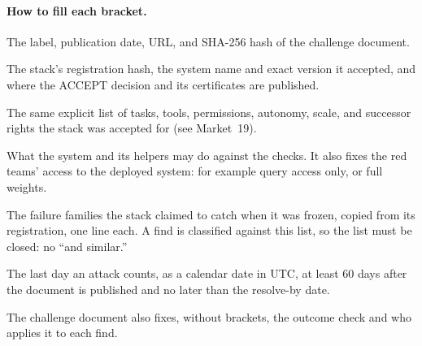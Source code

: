 \begin{predictionbackground}
\paragraph{How to fill each bracket.}
\begin{description}[style=nextline,leftmargin=1.6em]
\item[{\texttt{[protocol version]}}]
The label, publication date, URL, and SHA-256 hash of the challenge document.
\item[{\texttt{[stack, system, and version]}}]
The stack's registration hash, the system name and exact version it accepted, and where the ACCEPT decision and its certificates are published.
\item[{\texttt{[deployment class]}}]
The same explicit list of tasks, tools, permissions, autonomy, scale, and successor rights the stack was accepted for (see Market~19).
\item[{\texttt{[threat model]}}]
What the system and its helpers may do against the checks.
It also fixes the red teams' access to the deployed system: for example query access only, or full weights.
\item[{\texttt{[listed families]}}]
The failure families the stack claimed to catch when it was frozen, copied from its registration, one line each.
A find is classified against this list, so the list must be closed: no ``and similar.''
\item[{\texttt{[close date]}}]
The last day an attack counts, as a calendar date in UTC, at least 60 days after the document is published and no later than the resolve-by date.
\end{description}
The challenge document also fixes, without brackets, the outcome check and who applies it to each find.
\end{predictionbackground}

